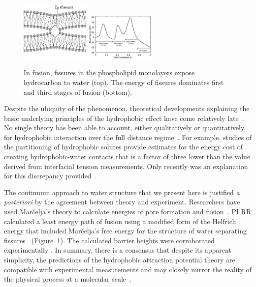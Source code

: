 \begin{figure}
  \vspace{-5pt}
\includegraphics[width=0.3\textwidth]{figures/Fissure.jpg}
\includegraphics[width=0.3\textwidth]{figures/Landscape.jpg}
\caption{\label{fig:fissure} In fusion, fissures in the phospholipid
  monolayers expose hydrocarbon to water (top). The energy of fissures
  dominates first and third stages of fusion (bottom).
}
\end{figure}
Despite the ubiquity of
the phenomenon, theoretical developments explaining the basic underlying
principles of the hydrophobic effect have come relatively
late~\cite{Ch05}.
No single theory has been able to account, either qualitatively
or quantitatively,
for hydrophobic interaction over the full distance
regime~\cite{Lum1999, Lin2005, Meyer2006, Ducker2016}.
For example, studies of the partitioning of
hydrophobic solutes provide estimates for the energy cost of creating
hydrophobic-water contacts
that is a factor of three lower than the value derived from interfacial
tension measurements. Only recently was an explanation for this
discrepancy provided~\cite{Jackson2016}.

The continuum approach to water structure
that we present here is justified
\textit{a posteriori} by the agreement between theory and experiment.
Researchers have used Mar\v{c}elja's theory to calculate
energies of pore formation and fusion~\cite{Gletal88, Aketal17,
RyKlYaCo16}.
PI RR calculated a least energy path 
of fusion using a modified form of the Helfrich energy that
included Mar\v{c}elja's free energy for the structure of water
separating fissures~\cite{RyKlYaCo16} (Figure~\ref{fig:fissure}).
The calculated barrier heights were 
corroborated experimentally \cite{FrRoPi17}. In summary,
there is a consensus that despite its apparent simplicity, the predictions
of the hydrophobic attraction potential theory are compatible with
experimental measurements and may closely mirror the reality of
the physical process at a molecular scale~\cite{FrRoPi17, Fretal21}.

